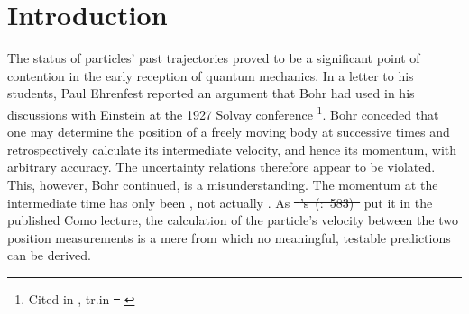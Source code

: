 \documentclass[pdflatex]{sn-jnl}
\renewcommand{\cite}{\citealp}
\renewcommand{\citets}[2][]{\citeauthor{#2}'s (\citeyear{#2}\if\relax\detokenize{#1}\relax\else: #1\fi)}
\providecommand{\DIFadd}[1]{{\protect\color{blue}\uwave{#1}}} %
\providecommand{\DIFdel}[1]{{\protect\color{red}\sout{#1}}}                      %
\providecommand{\DIFaddbegin}{} %
\providecommand{\DIFaddend}{} %
\providecommand{\DIFdelbegin}{} %
\providecommand{\DIFdelend}{} %
\begin{document}
\DIFaddbegin {}

\DIFaddend \maketitle
\section*{Introduction}

The status of particles’ past trajectories proved to be a significant point of contention in the early reception of quantum mechanics. In a letter to his students, Paul Ehrenfest reported an argument that Bohr had used in his discussions with Einstein at the 1927 Solvay conference \footnote{Cited in \cite[415–418]{Bohr1985}, tr.\DIFaddbegin \DIFadd{~}\DIFaddend in \DIFdelbegin \DIFdel{\mbox{%
\cite[37–41][415–418]{Bohr1985}}\hskip0pt%
}\DIFdelend \DIFaddbegin \DIFadd{415–418}\DIFaddend }. Bohr conceded that one may determine the position of a freely moving body at successive times and retrospectively calculate its intermediate velocity, and hence its momentum, with arbitrary accuracy. The uncertainty relations therefore appear to be violated. This, however, Bohr continued, is a misunderstanding. The momentum at the intermediate time has only been , not actually  . As \DIFdelbegin \DIFdel{\mbox{%
\citets[583]{Bohr1928} }\hskip0pt%
}\DIFdelend \DIFaddbegin \DIFadd{\mbox{%
\citet[583]{Bohr1928} }\hskip0pt%
}\DIFaddend put it in the published Como lecture, the calculation of the particle’s velocity between the two position measurements is a mere  from which no meaningful, testable predictions can be derived.


\DIFdelbegin %


\end{document}
